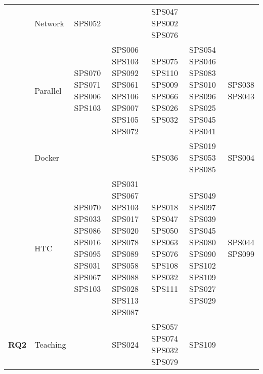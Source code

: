 \begin{table*}[htbp]
\begin{tabularx}{\textwidth}{p{0.8cm}p{2.5cm}>{\raggedright\arraybackslash}X>{\raggedright\arraybackslash}X>{\raggedright\arraybackslash}X>{\raggedright\arraybackslash}X>{\raggedright\arraybackslash}X}
		\addlinespace[0.3em]
		                                      & Network                 & SPS052                                                  &                                                                                                                               & SPS047 SPS002 SPS076                                                                       &                                                                                     &                                    \\
		\addlinespace[0.3em]
		                                      & Parallel                & SPS070 SPS071 SPS006 SPS103                             & SPS006 SPS103 SPS092 SPS061 SPS106 SPS007 SPS105 SPS072                                                                       & SPS075 SPS110 SPS009 SPS066 SPS026 SPS032                                                  & SPS054 SPS046 SPS083 SPS010 SPS096 SPS025 SPS045 SPS041                             & SPS038 SPS043                      \\
		\addlinespace[0.3em]
		                                      & Docker                  &                                                         &                                                                                                                               & SPS036                                                                                     & SPS019 SPS053 SPS085                                                                & SPS004                             \\
		\addlinespace[0.3em]
		                                      & HTC                     & SPS070 SPS033 SPS086 SPS016 SPS095 SPS031 SPS067 SPS103 & SPS031 SPS067 SPS103 SPS017 SPS020 SPS078 SPS089 SPS058 SPS088 SPS028 SPS113 SPS087                                           & SPS018 SPS047 SPS050 SPS063 SPS076 SPS108 SPS032 SPS111                                    & SPS049 SPS097 SPS039 SPS045 SPS080 SPS090 SPS102 SPS109 SPS027 SPS029               & SPS044 SPS099                      \\
		\midrule
		\multirow{3}{*}[-2em]{\textbf{RQ2}}   & Teaching                &                                                         & SPS024                                                                                                                        & SPS057 SPS074 SPS032 SPS079                                                                & SPS109                                                                              &                                    \\

\end{tabularx}
\end{table*}
